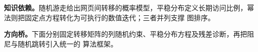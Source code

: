 \documentclass[UTF8,a4paper,11pt,openany]{ctexbook}
\begin{document}
\setcounter{page}{896}
\setcounter{chapter}{36}
\setcounter{section}{0}
\setcounter{figure}{0}
\pagestyle{headings}
\textbf{知识依赖。}随机游走给出网页间转移的概率模型，平稳分布定义长期访问比例，幂法则把固定点方程转化为可执行的数值迭代；三者并列支撑 \PageRank{} 图排序。

\FloatBarrier
\textbf{方向桥。}下面分别固定转移矩阵的列随机约束、平稳分布方程及残差诊断，再把阻尼与随机跳转引入统一的 \PageRank{} 算法框架。
\end{document}
